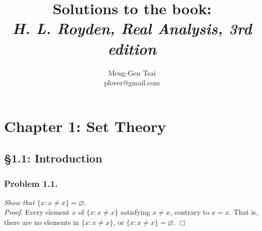 \documentclass{article}
\title{\textbf{Solutions to the book: \\ \emph{H. L. Royden, Real Analysis, 3rd edition}}}
\author{Meng-Gen Tsai \\ plover@gmail.com}
\begin{document}
\maketitle
\tableofcontents












\newpage
\section*{Chapter 1: Set Theory \\}



\subsection*{\S 1.1: Introduction \\}



\subsubsection*{Problem 1.1.}
\emph{Show that $\{ x : x \neq x \} = \varnothing$.} \\

\emph{Proof.}
Every element $x$ of $\{ x : x \neq x \}$ satisfying $x \neq x$,
contrary to $x = x$. That is, there are no elements in $\{ x : x \neq x \}$,
or $\{ x : x \neq x \} = \varnothing$.
$\Box$ \\\\



\end{document}
